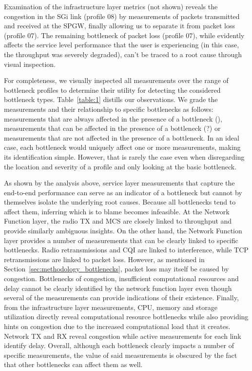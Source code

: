 \documentclass[journal,comsoc]{IEEEtran}
\begin{document}
% 
Examination of the infrastructure layer metrics (not shown) reveals the congestion in the SGi link (profile 08) by measurements of packets transmitted and received at the SPGW, finally allowing us to separate it from packet loss (profile 07).
The remaining bottleneck of packet loss (profile 07), while evidently affects the service level performance that the user is experiencing (in this case, the throughput was severely degraded), can't be traced to a root cause through visual inspection.


% 
\medskip

For completeness, we visually inspected all measurements over the range of bottleneck profiles to determine their utility for detecting the considered bottleneck types.
Table~\ref{table:1} distills our observations.
We grade the measurements and their relationship to specific bottlenecks as follows:
measurements that are always affected in the presence of a bottleneck (\checkmark), measurements that can be affected in the presence of a bottleneck (\checkmark ?) or measurements that are not affected in the presence of a bottleneck.
In an ideal case, each bottleneck would uniquely affect one or more measurements, making its identification simple. 
However, that is rarely the case even when disregarding the location and severity of a profile and only looking at the basic bottleneck.

As shown by the analysis above, service layer measurements that capture the end-to-end performance can serve as an indicator of a bottleneck but cannot by themselves isolate the underlying root causes.
Because all bottlenecks tend to affect them, inferring which is to blame becomes infeasible.
At the Network Function layer, the radio TX and MCS are closely linked to throughput and provide similarly ambiguous insights.
On the other hand, the Network Function layer provides a number of measurements that can be clearly linked to specific bottlenecks. Radio retransmissions and CQI are linked to interference, while TCP retransmissions are linked to packet loss.
However, as mentioned in Section~\ref{sec:methodology_bottlenecks}, packet loss may itself be caused by congestion. 
Bottlenecks of congestion, insufficient computational resources and delay cannot be clearly identified by the network function layer even though several of the measurements can provide indications of their existence.
Finally, from the infrastructure layer measurements, CPU, memory and storage utilization directly reveal computational resource bottlenecks while also providing hints on congestion due to the increased computational load that it creates. Network TX and RX reveal congestion while active measurements for each link identify delay.
Overall, although each bottleneck clearly impacts a number of specific measurements, the value of said measurements is obscured by the fact that other bottlenecks can affect them as well.
\end{document}

